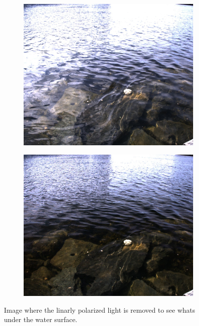 

\begin{figure}[H]
    \begin{subfigure}[T]{.49\textwidth}
        \includegraphics[width=\textwidth]{figures/pictures/img_4722_s0.jpg}
    \end{subfigure} \hfill
    \begin{subfigure}[T]{.49\textwidth}
        \includegraphics[width=\textwidth]{figures/pictures/img_4722_unpol.jpg}
    \end{subfigure}
    \caption{Image where the linarly polarized light is removed to see whats under the water surface.}
\end{figure}
\vspace{-.5cm}

